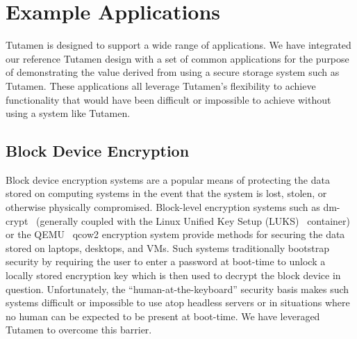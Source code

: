 \section{Example Applications}
\label{sec:apps}

Tutamen is designed to support a wide range of applications. We have
integrated our reference Tutamen design with a set of common
applications for the purpose of demonstrating the value derived from
using a secure storage system such as Tutamen. These applications all
leverage Tutamen's flexibility to achieve functionality that would
have been difficult or impossible to achieve without using a system
like Tutamen.

\subsection{Block Device Encryption}

Block device encryption systems are a popular means of protecting the
data stored on computing systems in the event that the system is lost,
stolen, or otherwise physically compromised.  Block-level encryption
systems such as dm-crypt~\cite{dm-crypt} (generally coupled with the
Linux Unified Key Setup (LUKS)~\cite{luks} container) or the
QEMU~\cite{qemu} qcow2 encryption system provide methods for securing
the data stored on laptops, desktops, and VMs. Such systems
traditionally bootstrap security by requiring the user to enter a
password at boot-time to unlock a locally stored encryption key which
is then used to decrypt the block device in question. Unfortunately,
the ``human-at-the-keyboard'' security basis makes such systems
difficult or impossible to use atop headless servers or in situations
where no human can be expected to be present at boot-time. We have
leveraged Tutamen to overcome this barrier.

